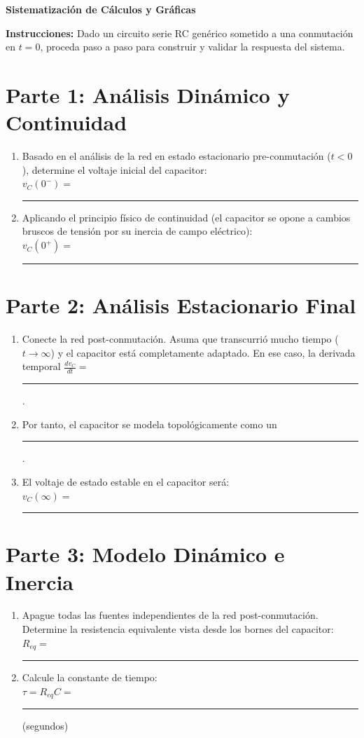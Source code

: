 \documentclass[11pt, a4paper]{article}
\begin{document}
\begin{tcolorbox}[colback=ucbblue!5!white, colframe=ucbblue, title=\textbf{Hoja de Análisis Guiado: Transitorios de Primer Orden RC}]
    \centering \textbf{Sistematización de Cálculos y Gráficas}
\end{tcolorbox}

\noindent\textbf{Instrucciones:} Dado un circuito serie RC genérico sometido a una conmutación en $t=0$, proceda paso a paso para construir y validar la respuesta del sistema.

\vspace{0.4cm}
\section*{Parte 1: Análisis Dinámico y Continuidad}
\begin{enumerate}
    \item Basado en el análisis de la red en estado estacionario pre-conmutación ($t<0$), determine el voltaje inicial del capacitor:\\
    $v_C(0^-) =$ \rule{4cm}{0.4pt}
    
    \item Aplicando el principio físico de continuidad (el capacitor se opone a cambios bruscos de tensión por su inercia de campo eléctrico):\\
    $v_C(0^+) =$ \rule{4cm}{0.4pt}
\end{enumerate}

\section*{Parte 2: Análisis Estacionario Final}
\begin{enumerate}
    \item Conecte la red post-conmutación. Asuma que transcurrió mucho tiempo ($t \to \infty$) y el capacitor está completamente adaptado. En ese caso, la derivada temporal $\frac{dv_C}{dt} = $ \rule{2cm}{0.4pt}.
    \item Por tanto, el capacitor se modela topológicamente como un \rule{4cm}{0.4pt}.
    \item El voltaje de estado estable en el capacitor será:\\
    $v_C(\infty) =$ \rule{4cm}{0.4pt}
\end{enumerate}

\section*{Parte 3: Modelo Dinámico e Inercia}
\begin{enumerate}
    \item Apague todas las fuentes independientes de la red post-conmutación. Determine la resistencia equivalente vista desde los bornes del capacitor:\\
    $R_{eq} =$ \rule{4cm}{0.4pt}
    
    \item Calcule la constante de tiempo:\\
    $\tau = R_{eq}C =$ \rule{4cm}{0.4pt} (segundos)
\end{enumerate}
\end{document}
